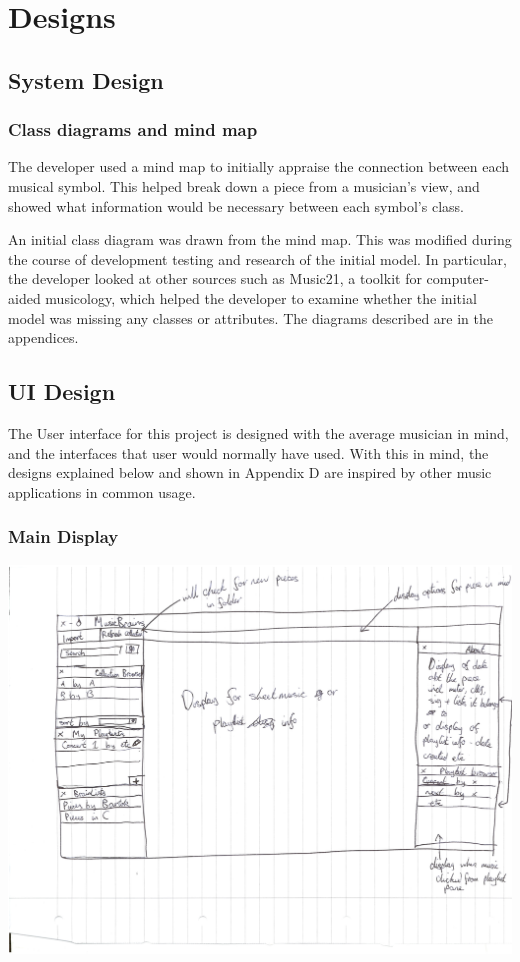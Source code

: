 \section{Designs}
\subsection{System Design}
\subsubsection{Class diagrams and mind map}
The developer used a mind map to initially appraise the connection between each musical symbol. This helped break down a piece from a musician's view, and showed what information would be necessary between each symbol's class.

An initial class diagram was drawn from the mind map. This was modified during the course of development testing and research of the initial model. In particular, the developer looked at other sources such as Music21, a toolkit for computer-aided musicology\parencite{Music21}, which helped the developer to examine whether the initial model was missing any classes or attributes. The diagrams described are in the appendices.
\subsection{UI Design}
The User interface for this project is designed with the average musician in mind, and the interfaces that user would normally have used. With this in mind, the designs explained below and shown in Appendix D are inspired by other music applications in common usage.

\subsubsection{Main Display}
\begin{center}
\includegraphics[width=380pt]{main_view.png}
\end{center}

